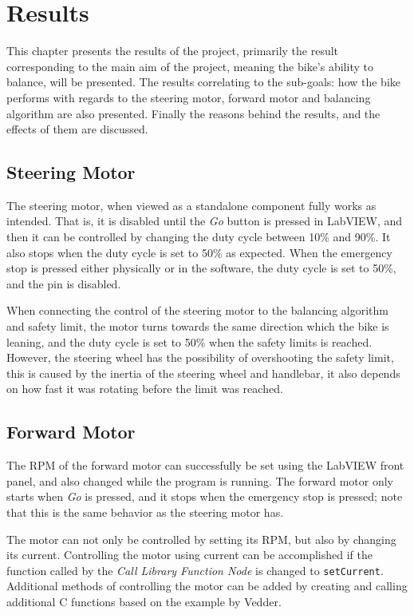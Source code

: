 \chapter{Results}\label{results}

This chapter presents the results of the project, primarily the result corresponding to the main aim of the project, meaning the bike's ability to balance, will be presented. The results correlating to the sub-goals: how the bike performs with regards to the steering motor, forward motor and balancing algorithm are also presented. Finally the reasons behind the results, and the effects of them are discussed.

\section{Steering Motor}

The steering motor, when viewed as a standalone component fully works as intended. That is, it is disabled until the \textit{Go} button is pressed in LabVIEW, and then it can be controlled by changing the duty cycle between 10\% and 90\%. It also stops when the duty cycle is set to 50\% as expected. When the emergency stop is pressed either physically or in the software, the duty cycle is set to 50\%, and the pin is disabled. 

When connecting the control of the steering motor to the balancing algorithm and safety limit, the motor turns towards the same direction which the bike is leaning, and the duty cycle is set to 50\% when the safety limits is reached. However, the steering wheel has the possibility of overshooting the safety limit, this is caused by the inertia of the steering wheel and handlebar, it also depends on how fast it was rotating before the limit was reached.


\section{Forward Motor}

The RPM of the forward motor can successfully be set using the LabVIEW front panel, and also changed while the program is running. The forward motor only starts when \textit{Go} is pressed, and it stops when the emergency stop is pressed; note that this is the same behavior as the steering motor has. 

The motor can not only be controlled by setting its RPM, but also by changing its current. Controlling the motor using current can be accomplished if the function called by the \textit{Call Library Function Node} is changed to \texttt{setCurrent}. Additional methods of controlling the motor can be added by creating and calling additional C functions based on the example by Vedder.

